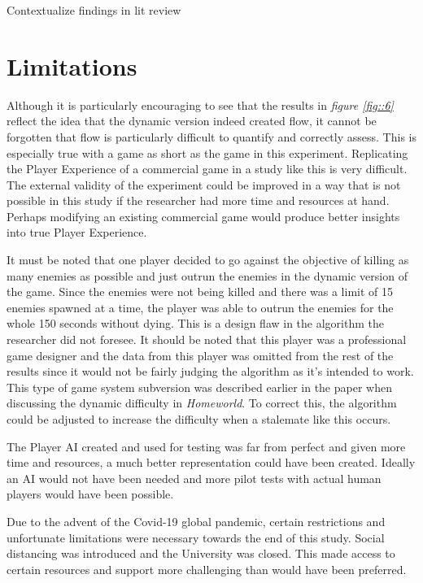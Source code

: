\documentclass[journal]{IEEEtran}
\begin{document}
Contextualize findings in lit review


\section{Limitations}

Although it is particularly encouraging to see that the results in \textit{figure \ref{fig::6}} reflect the idea that the dynamic version indeed created flow, it cannot be forgotten that flow is particularly difficult to quantify and correctly assess. This is especially true with a game as short as the game in this experiment. Replicating the Player Experience of a commercial game in a study like this is very difficult. The external validity of the experiment could be improved in a way that is not possible in this study if the researcher had more time and resources at hand. Perhaps modifying an existing commercial game would produce better insights into true Player Experience.

It must be noted that one player decided to go against the objective of killing as many enemies as possible and just outrun the enemies in the dynamic version of the game. Since the enemies were not being killed and there was a limit of 15 enemies spawned at a time, the player was able to outrun the enemies for the whole 150 seconds without dying. This is a design flaw in the algorithm the researcher did not foresee. It should be noted that this player was a professional game designer and the data from this player was omitted from the rest of the results since it would not be fairly judging the algorithm as it's intended to work. This type of game system subversion was described earlier in the paper when discussing the dynamic difficulty in \textit{Homeworld}. To correct this, the algorithm could be adjusted to increase the difficulty when a stalemate like this occurs.

The Player AI created and used for testing was far from perfect and given more time and resources, a much better representation could have been created. Ideally an AI would not have been needed and more pilot tests with actual human players would have been possible.

Due to the advent of the Covid-19 global pandemic, certain restrictions and unfortunate limitations were necessary towards the end of this study. Social distancing was introduced and the University was closed. This made access to certain resources and support more challenging than would have been preferred.
\end{document}
